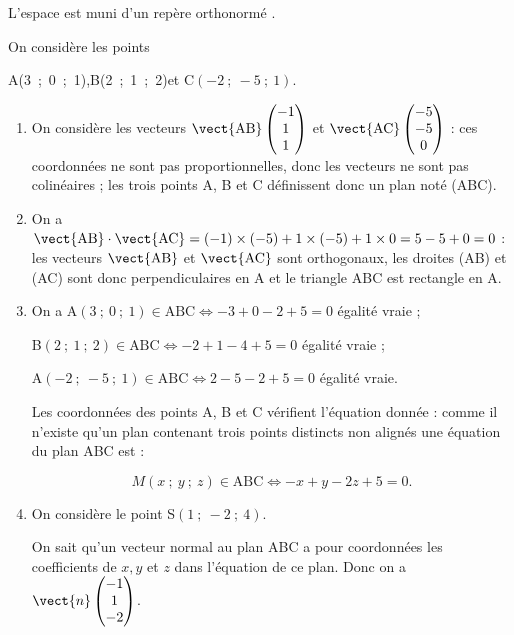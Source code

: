 \medskip

L'espace est muni d'un repère orthonormé \Oijk.

On considère les points 
\begin{center}A(3~;~0~;~1),\qquad  B(2~;~1~;~2)\quad  et \quad C$(- 2~;~- 5~;~1)$.\end{center}

\smallskip

\begin{enumerate}
\item 
On considère les vecteurs $\vect{\text{AB}}\begin{pmatrix}-1\\1\\1\end{pmatrix}$ et $\vect{\text{AC}}\begin{pmatrix}-5\\-5\\0\end{pmatrix}$ : ces coordonnées ne sont pas proportionnelles, donc les vecteurs ne sont pas colinéaires ; les trois points A, B et C définissent donc un plan noté (ABC).
\item 
On a $\vect{\text{AB}} \cdot \vect{\text{AC}} = (- 1) \times (- 5) + 1 \times (- 5) + 1 \times 0 = 5 - 5 + 0 = 0$ : les vecteurs $\vect{\text{AB}}$ et $\vect{\text{AC}}$ sont orthogonaux, les droites (AB) et (AC) sont donc perpendiculaires en A et le triangle ABC est rectangle en A.
\item 

On a A$(3~;~0~;~1) \in \text{ABC} \iff - 3  + 0 - 2 + 5 = 0$ égalité vraie ;

B$(2~;~1~;~2) \in \text{ABC} \iff - 2  + 1 - 4 + 5 = 0$ égalité vraie ;

A$(- 2~;~- 5~;~1) \in \text{ABC} \iff 2  - 5 - 2 + 5 = 0$ égalité vraie.

Les coordonnées des points A, B et C vérifient l'équation donnée : comme il n'existe qu'un plan contenant trois points distincts non alignés une équation du plan ABC est :

\[M(x~;~y~;~z) \in \text{ABC} \iff -x + y - 2z + 5 = 0.\]

\item On considère le point S$(1~;~-2~;~4)$.




On sait qu'un vecteur normal au plan ABC a pour coordonnées les coefficients de $x, y$ et $z$ dans l'équation de ce plan. Donc on a $\vect{n}\begin{pmatrix}-1\\1\\-2\end{pmatrix}$.


\end{enumerate}
